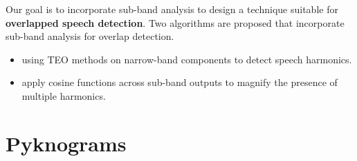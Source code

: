 Our goal is to incorporate sub-band analysis to design a technique suitable for {\bf overlapped speech detection}. 
Two algorithms are proposed that incorporate sub-band analysis for overlap detection. 
\begin{itemize}
	\item using TEO methods on narrow-band components to detect speech harmonics. 
	\item apply cosine functions across sub-band outputs to magnify the presence of multiple harmonics. 
\end{itemize}



\section{Pyknograms}
\label{sec:ovldet}

